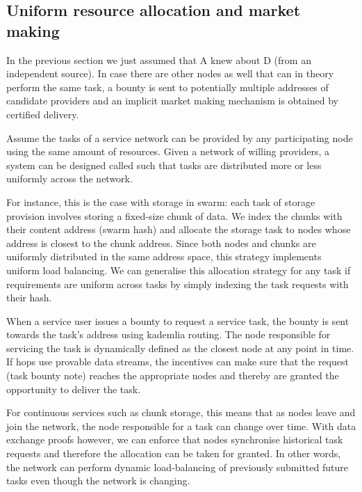 \subsection{Uniform resource allocation and market making}
\label{sec:wasp}

In the previous section we just assumed that A knew about D (from an independent source). In case there are other nodes as well that can in theory perform the same task, a bounty is sent to potentially multiple addresses of candidate providers and an implicit market making mechanism is obtained by certified delivery.

Assume the tasks of a service network can be provided by any participating node using the same amount of resources. Given a network of willing providers, a system can be designed called  such that tasks are distributed more or less uniformly across the network.

For instance, this is the case with storage in swarm: each task of storage provision involves storing a fixed-size chunk of data. We index the chunks with their content address (swarm hash) and allocate the storage task to nodes whose address is closest to the chunk address. Since both nodes and chunks are uniformly distributed in the same address space, this strategy implements uniform load balancing. We can generalise this allocation strategy for any task if requirements are uniform across tasks by simply indexing the task requests with their hash.

When a service user issues a bounty to request a service task, the bounty is sent towards the task's address using kademlia routing. The node responsible for servicing the task is dynamically defined as the closest node at any point in time. If hops use provable data streams, the incentives can make sure that the request (task bounty note) reaches the appropriate nodes and thereby are granted the opportunity to deliver the task.

For continuous services such as chunk storage, this means that as nodes leave and join the network, the node responsible for a task can change over time. With data exchange proofs however, we can enforce that nodes synchronise historical task requests and therefore the allocation can be taken for granted. In other words, the network can perform dynamic load-balancing of previously submitted future tasks even though the network is changing.

